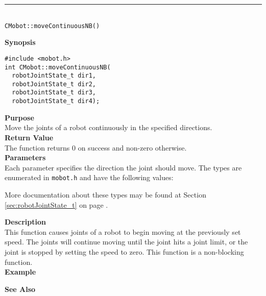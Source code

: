 \noindent
\vspace{5pt}
\rule{4.5in}{0.015in}\\
\noindent
{\LARGE \texttt{CMobot::moveContinuousNB()}}\\
{}

\noindent
{\bf Synopsis}
\vspace{-8pt}
\begin{verbatim}
#include <mobot.h>
int CMobot::moveContinuousNB(
  robotJointState_t dir1, 
  robotJointState_t dir2, 
  robotJointState_t dir3, 
  robotJointState_t dir4);
\end{verbatim}

\noindent
{\bf Purpose}\\
Move the joints of a robot continuously in the specified directions.\\

\noindent
{\bf Return Value}\\
The function returns 0 on success and non-zero otherwise.\\

\noindent
{\bf Parameters}\\
Each parameter specifies the direction the joint should move. The types
are enumerated in \texttt{mobot.h} and have the following values:

More documentation about these types may be found at Section
\ref{sec:robotJointState_t} on page
\pageref{sec:robotJointState_t}.

\noindent
{\bf Description}\\
This function causes joints of a robot to begin moving at the previously set
speed. The joints will continue moving until the joint hits a joint limit, or
the joint is stopped by setting the speed to zero. This function is a non-blocking
function.\\

\noindent
{\bf Example}\\
\noindent

\noindent
{\bf See Also}\\

